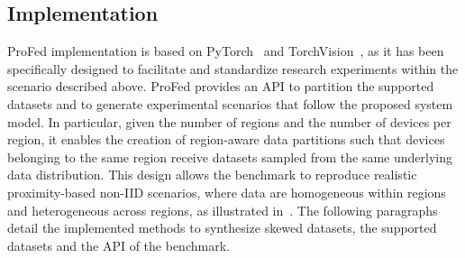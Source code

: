 \subsection{Implementation}

ProFed implementation is based on PyTorch~\cite{DBLP:conf/asplos/AnselYHGJVBBBBC24} 
 and TorchVision~\cite{TorchVision}, 
 as it has been specifically designed to facilitate and 
 standardize research experiments within the scenario described above. 
%
ProFed provides an API to partition the supported datasets and 
 to generate experimental scenarios that follow the proposed system model. 
% 
In particular, 
 given the number of regions and the number of devices per region, 
 it enables the creation of region-aware data partitions such that 
 devices belonging to the same region receive datasets sampled from 
 the same underlying data distribution. 
%
This design allows the benchmark to reproduce realistic proximity-based non-IID scenarios, 
 where data are homogeneous within regions and heterogeneous across regions, 
 as illustrated in~.
%
The following paragraphs detail the implemented methods to synthesize skewed datasets, 
 the supported datasets and the API of the benchmark.



